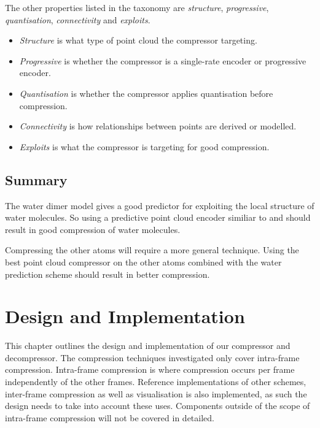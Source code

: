 \documentclass{report}
\begin{document}
The other properties listed in the taxonomy are \emph{structure},
\emph{progressive}, \emph{quantisation}, \emph{connectivity} and
\emph{exploits}.

\begin{itemize}
\item \emph{Structure} is what type of point cloud the compressor targeting.

\item \emph{Progressive} is whether the compressor is a single-rate encoder or
  progressive encoder.

\item \emph{Quantisation} is whether the compressor applies quantisation
  before compression.

\item \emph{Connectivity} is how relationships between points are derived or
  modelled.

\item \emph{Exploits} is what the compressor is targeting for good
  compression.
\end{itemize}


\section{Summary}

The water dimer model gives a good predictor for exploiting the local
structure of water molecules. So using a predictive point cloud encoder
similiar to \citep{merrycomp} and \citep{gumholdcomp} should result in good
compression of water molecules.

Compressing the other atoms will require a more general technique. Using the
best point cloud compressor on the other atoms combined with the water
prediction scheme should result in better compression.


\chapter{Design and Implementation}

This chapter outlines the design and implementation of our compressor and
decompressor. The compression techniques investigated only cover intra-frame
compression. Intra-frame compression is where compression occurs per frame
independently of the other frames. Reference implementations of other schemes,
inter-frame compression as well as visualisation is also implemented, as such
the design needs to take into account these uses. Components outside of the
scope of intra-frame compression will not be covered in detailed.
\end{document}
